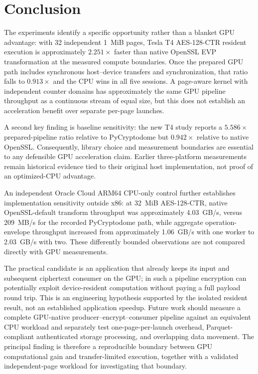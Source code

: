\section{Conclusion}
\label{sec:conclusion}
The experiments identify a specific opportunity rather than a blanket GPU
advantage: with 32 independent 1~MiB pages, Tesla T4 AES-128-CTR resident
execution is approximately $2.251\times$ faster than native OpenSSL EVP
transformation at the measured compute boundaries. Once the prepared GPU path
includes synchronous host--device transfers and synchronization, that ratio
falls to $0.913\times$ and the CPU wins in all five sessions. A page-aware
kernel with independent counter domains has approximately the same GPU
pipeline throughput as a continuous stream of equal size, but this does not
establish an acceleration benefit over separate per-page launches.

A second key finding is baseline sensitivity: the new T4 study reports a
$5.586\times$ prepared-pipeline ratio relative to PyCryptodome but
$0.942\times$ relative to native OpenSSL. Consequently, library choice and
measurement boundaries are essential to any defensible GPU acceleration
claim. Earlier three-platform measurements remain historical evidence tied to
their original host implementation, not proof of an optimized-CPU advantage.


An independent Oracle Cloud ARM64 CPU-only control further establishes
implementation sensitivity outside x86: at 32~MiB AES-128-CTR, native
OpenSSL-default transform throughput was approximately 4.03~GB/s,
versus 209~MB/s for the recorded PyCryptodome path, while aggregate
operation-envelope throughput increased from approximately 1.06~GB/s
with one worker to 2.03~GB/s with two. These differently bounded
observations are not compared directly with GPU measurements.

The practical candidate is an application that already keeps its input and
subsequent ciphertext consumer on the GPU; in such a pipeline encryption can
potentially exploit device-resident computation without paying a full payload
round trip. This is an engineering hypothesis supported by the isolated
resident result, not an established application speedup. Future work should
measure a complete GPU-native producer--encrypt--consumer pipeline against an
equivalent CPU workload and separately test one-page-per-launch overhead,
Parquet-compliant authenticated storage processing, and overlapping data
movement. The principal finding is therefore a reproducible boundary between
GPU computational gain and transfer-limited execution, together with a
validated independent-page workload for investigating that boundary.
